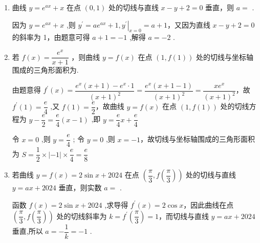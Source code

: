 \begin{enumerate}
    \item 曲线 $y = {{e}}^{ax} + x$ 在点 $\left( {0,1}\right)$ 处的切线与直线 $x - y + 2 = 0$ 垂直，则 $a =$ .
    \begin{jieda}
        因为 $y = {{e}}^{ax} + x$ ,则 ${y}^{\prime } = a{{e}}^{ax} + 1,{\left. {y}^{\prime }\right| }_{x = 0} = a + 1$，又因为直线 $x - y + 2 = 0$ 的斜率为 1，由题意可得 $a + 1 =  - 1$ ,解得 $a =  - 2$ .
    \end{jieda}

    \item 若 $f\left( x\right)  = \dfrac{{{e}}^{x}}{x + 1}$ ，则曲线 $y = f\left( x\right)$ 在点 $\left( {1,f\left( 1\right) }\right)$ 处的切线与坐标轴围成的三角形面积为.
    \begin{jieda}
        由题意得 ${f}^{\prime }\left( x\right)  = \dfrac{{{e}}^{x}\left( {x + 1}\right)  - {{e}}^{x} \cdot  1}{{\left( x + 1\right) }^{2}} = \dfrac{{{e}}^{x}\left( {x + 1 - 1}\right) }{{\left( x + 1\right) }^{2}} = \dfrac{x{{e}}^{x}}{{\left( x + 1\right) }^{2}}$，故 ${f}^{\prime }\left( 1\right)  = \dfrac{{e}}{4}$ ,又 $f\left( 1\right)  = \dfrac{{e}}{2}$，故曲线 $y = f\left( x\right)$ 在点 $\left( {1,f\left( 1\right) }\right)$ 处的切线方程为 $y - \dfrac{{e}}{2} = \dfrac{{e}}{4}\left( {x - 1}\right)$ ,即 $y = \dfrac{{e}}{4}x + \dfrac{{e}}{4}$
        
        令 $x = 0$ ,则 $y = \dfrac{{e}}{4}$ ; 令 $y = 0$ ,则 $x =  - 1$，故切线与坐标轴围成的三角形面积为 $S = \dfrac{1}{2} \times  \left| {-1}\right|  \times  \dfrac{{e}}{4} = \dfrac{{e}}{8}$
    \end{jieda}

    \item 若曲线 $y = f\left( x\right)  = 2\sin x + {2024}$ 在点 $\left( {\dfrac{\pi }{3},f\left( \dfrac{\pi }{3}\right) }\right)$ 处的切线与直线 $y = {ax} + {2024}$ 垂直，则实数 $a =$ .
    \begin{jieda}
        函数 $f\left( x\right)  = 2\sin x + {2024}$ ,求导得 ${f}^{\prime }\left( x\right)  = 2\cos x$，因此曲线在点 $\left( {\dfrac{\pi }{3},f\left( \dfrac{\pi }{3}\right) }\right)$ 处的切线斜率为 $k = {f}^{\prime }\left( \dfrac{\pi }{3}\right)  = 1$，而切线与直线 $y = {ax} + {2024}$ 垂直,所以 $a =  - \dfrac{1}{k} =  - 1$ .
    \end{jieda}


\end{enumerate}
